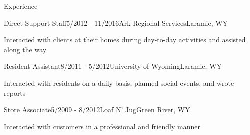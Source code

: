 \documentclass{resume} %
\begin{document}
\begin{rSection}{Experience}
	\begin{rSubEmploymentSection}{Direct Support Staff}{5/2012 - 11/2016}{Ark Regional Services}{Laramie, WY}
		\item Interacted with clients at their homes during day-to-day activities and assisted along the way
	\end{rSubEmploymentSection}
		
	\begin{rSubEmploymentSection}{Resident Assistant}{8/2011 - 5/2012}{University of Wyoming}{Laramie, WY}
		\item Interacted with residents on a daily basis, planned social events, and wrote reports
	\end{rSubEmploymentSection}
		
	\begin{rSubEmploymentSection}{Store Associate}{5/2009 - 8/2012}{Loaf N' Jug}{Green River, WY}
		\item Interacted with customers in a professional and friendly manner
	\end{rSubEmploymentSection}

\end{rSection}
\end{document}
